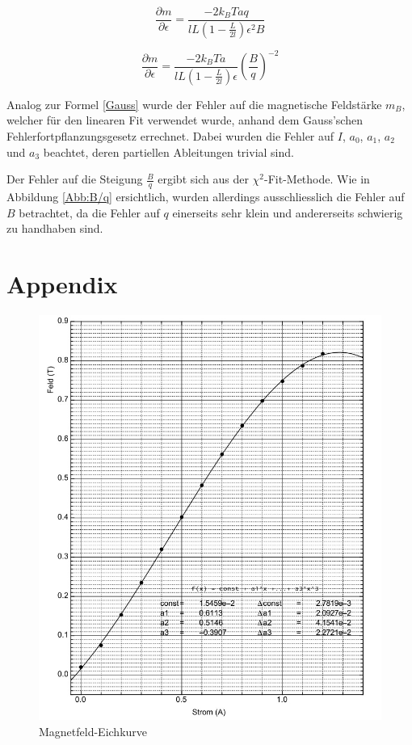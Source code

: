 \documentclass[a4paper,parskip,11pt, DIV12]{scrreprt}
\begin{document}
\begin{equation}
\frac{\partial m}{\partial \epsilon} = \frac{-2k_BTaq}{lL(1-\frac{L}{2l})\epsilon^2 B}
\end{equation}

\begin{equation} \label{letzteableitung}
\frac{\partial m}{\partial \epsilon} = \frac{-2k_BTa}{lL(1-\frac{L}{2l})\epsilon} \left(\frac{B}{q}\right)^{-2}
\end{equation}

Analog zur Formel \ref{Gauss} wurde der Fehler auf die magnetische Feldstärke $m_B$, welcher für den linearen Fit verwendet wurde, anhand dem Gauss'schen Fehlerfortpflanzungsgesetz errechnet. Dabei wurden die Fehler auf $I$, $a_0$, $a_1$, $a_2$ und $a_3$ beachtet, deren partiellen Ableitungen trivial sind.

Der Fehler auf die Steigung $\frac{B}{q}$ ergibt sich aus der $\chi^2$-Fit-Methode. Wie in Abbildung \ref{Abb:B/q} ersichtlich, wurden allerdings ausschliesslich die Fehler auf $B$ betrachtet, da die Fehler auf $q$ einerseits sehr klein und andererseits schwierig zu handhaben sind. 
\clearpage

\chapter{Appendix}

\begin{figure}[H]
\centering
\includegraphics[scale=1]{Eichkurve}
\caption[Eichkurve]{Magnetfeld-Eichkurve}
\label{Abb:Eichkurve}
\end{figure}

 

\end{document}
